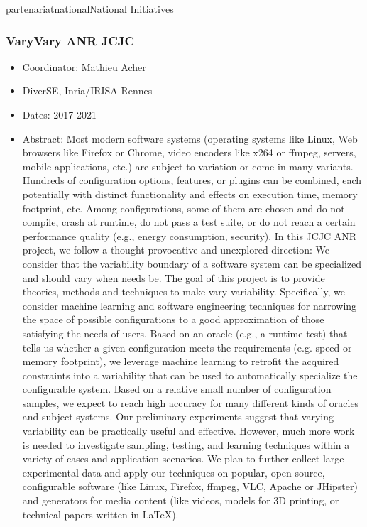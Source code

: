 \documentclass{ra2018}
\begin{document}
\begin{module}{partenariat}{national}{National Initiatives}
\subsubsection*{\label{project:varyvary}VaryVary ANR JCJC}
\begin{itemize}
	\item Coordinator: Mathieu Acher
	\item DiverSE, Inria/IRISA Rennes
	\item Dates: 2017-2021
	\item Abstract:  
    Most modern software systems (operating systems like Linux, Web browsers like Firefox or Chrome, video encoders like x264 or ffmpeg, servers, mobile applications, etc.) are subject to variation or come in many variants. Hundreds of configuration options, features, or plugins can be combined, each potentially with distinct functionality and effects on execution time, memory footprint, etc. Among configurations, some of them are chosen and do not compile, crash at runtime, do not pass a test suite, or do not reach a certain performance quality (e.g., energy consumption, security).
In this JCJC ANR project, we follow a thought-provocative and unexplored direction: We consider that the variability boundary of a software system can be specialized and should vary when needs be. The goal of this project is to provide theories, methods and techniques to make vary variability.
Specifically, we consider machine learning and software engineering techniques for narrowing the space of possible configurations to a good approximation of those satisfying the needs of users.
Based on an oracle (e.g., a runtime test) that tells us whether a given configuration meets the requirements (e.g. speed or memory footprint), we leverage machine learning to retrofit the acquired constraints into a variability that can be used to automatically specialize the configurable system. Based on a relative small number of configuration samples, we expect to reach high accuracy for many different kinds of oracles and subject systems.
Our preliminary experiments suggest that varying variability can be practically useful and effective. However, much more work is needed to investigate sampling, testing, and learning techniques within a variety of cases and application scenarios.
We plan to further collect large experimental data and apply our techniques on popular, open-source, configurable software (like Linux, Firefox, ffmpeg, VLC, Apache or JHipster) and generators for media content (like videos, models for 3D printing, or technical papers written in LaTeX).
\end{itemize}






\end{module}
\end{document}
